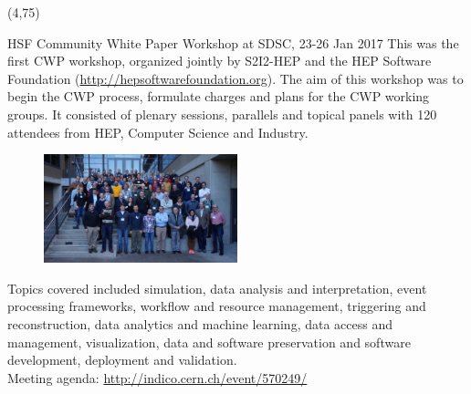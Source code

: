 \documentclass[final]{beamer}
\begin{document}
\begin{frame}{}
\begin{textblock}{38.0}(4,75)
\begin{block}{HSF Community White Paper Workshop at SDSC, 23-26 Jan 2017}
This was the first CWP workshop, organized jointly by S2I2-HEP and the HEP Software Foundation (\url{http://hepsoftwarefoundation.org}). The aim of this workshop was to begin the CWP process, formulate charges and plans for the CWP working groups. It consisted of plenary sessions, parallels and topical panels with 120 attendees from HEP, Computer Science and Industry.
\begin{figure}[tbph]
\centering
\includegraphics[width=0.50\textwidth]{images/20170125-HSF-SDSC-Workshop-group-photo.jpg}
\end{figure}
Topics covered included simulation, data analysis and interpretation, event processing frameworks, workflow and resource management, triggering and reconstruction, data analytics and machine learning, data access and management, visualization, data and software preservation and software development, deployment and validation. \\
{\small Meeting agenda: \url{http://indico.cern.ch/event/570249/}} \\




\end{block}
\end{textblock}
\end{frame}
\end{document}
